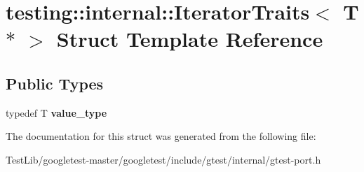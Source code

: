 \hypertarget{structtesting_1_1internal_1_1IteratorTraits_3_01T_01_5_01_4}{}\section{testing\+:\+:internal\+:\+:Iterator\+Traits$<$ T $\ast$ $>$ Struct Template Reference}
\label{structtesting_1_1internal_1_1IteratorTraits_3_01T_01_5_01_4}
\subsection*{Public Types}
\begin{DoxyCompactItemize}
\item 
\mbox{\label{structtesting_1_1internal_1_1IteratorTraits_3_01T_01_5_01_4_a7e46869ed36cc5aea898e243d270a8be}} 
typedef T {\bfseries value\+\_\+type}
\end{DoxyCompactItemize}


The documentation for this struct was generated from the following file\+:\begin{DoxyCompactItemize}
\item 
Test\+Lib/googletest-\/master/googletest/include/gtest/internal/gtest-\/port.\+h\end{DoxyCompactItemize}
